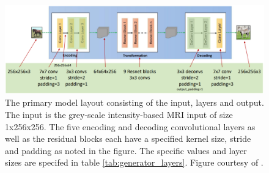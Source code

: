 \documentclass[12pt, fleqn, titlepage]{article}
\begin{document}
\begin{figure}[H]
	\centering
	\includegraphics[width=0.7\linewidth]{imgs/cyclegan_generator_layers}
	\caption{The primary model layout consisting of the input, layers and output. The input is the grey-scale intensity-based MRI input of size 1x256x256. The five encoding and decoding convolutional layers as well as the residual blocks each have a specified kernel size, stride and padding as noted in the figure. The specific values and layer sizes are specifed in table \ref{tab:generator_layers}. Figure courtesy of \cite{cyclegan_figures}.}
	\label{fig:cyclegangeneratorlayers}
\end{figure}
\end{document}
